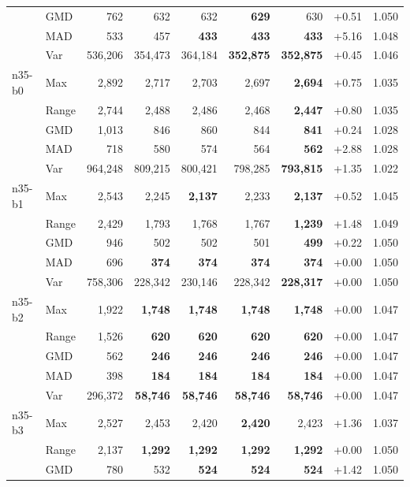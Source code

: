 \begin{small}
\begin{longtable}{llrrrrrrr}
 & GMD & 762 & 632 & 632 & \textbf{629} & 630 & +0.51 & 1.050 \\
 & MAD & 533 & 457 & \textbf{433} & \textbf{433} & \textbf{433} & +5.16 & 1.048 \\
 & Var & 536,206 & 354,473 & 364,184 & \textbf{352,875} & \textbf{352,875} & +0.45 & 1.046 \\
n35-b0 & Max & 2,892 & 2,717 & 2,703 & 2,697 & \textbf{2,694} & +0.75 & 1.035 \\
 & Range & 2,744 & 2,488 & 2,486 & 2,468 & \textbf{2,447} & +0.80 & 1.035 \\
 & GMD & 1,013 & 846 & 860 & 844 & \textbf{841} & +0.24 & 1.028 \\
 & MAD & 718 & 580 & 574 & 564 & \textbf{562} & +2.88 & 1.028 \\
 & Var & 964,248 & 809,215 & 800,421 & 798,285 & \textbf{793,815} & +1.35 & 1.022 \\
n35-b1 & Max & 2,543 & 2,245 & \textbf{2,137} & 2,233 & \textbf{2,137} & +0.52 & 1.045 \\
 & Range & 2,429 & 1,793 & 1,768 & 1,767 & \textbf{1,239} & +1.48 & 1.049 \\
 & GMD & 946 & 502 & 502 & 501 & \textbf{499} & +0.22 & 1.050 \\
 & MAD & 696 & \textbf{374} & \textbf{374} & \textbf{374} & \textbf{374} & +0.00 & 1.050 \\
 & Var & 758,306 & 228,342 & 230,146 & 228,342 & \textbf{228,317} & +0.00 & 1.050 \\
n35-b2 & Max & 1,922 & \textbf{1,748} & \textbf{1,748} & \textbf{1,748} & \textbf{1,748} & +0.00 & 1.047 \\
 & Range & 1,526 & \textbf{620} & \textbf{620} & \textbf{620} & \textbf{620} & +0.00 & 1.047 \\
 & GMD & 562 & \textbf{246} & \textbf{246} & \textbf{246} & \textbf{246} & +0.00 & 1.047 \\
 & MAD & 398 & \textbf{184} & \textbf{184} & \textbf{184} & \textbf{184} & +0.00 & 1.047 \\
 & Var & 296,372 & \textbf{58,746} & \textbf{58,746} & \textbf{58,746} & \textbf{58,746} & +0.00 & 1.047 \\
n35-b3 & Max & 2,527 & 2,453 & 2,420 & \textbf{2,420} & 2,423 & +1.36 & 1.037 \\
 & Range & 2,137 & \textbf{1,292} & \textbf{1,292} & \textbf{1,292} & \textbf{1,292} & +0.00 & 1.050 \\
 & GMD & 780 & 532 & \textbf{524} & \textbf{524} & \textbf{524} & +1.42 & 1.050 \\

\end{longtable}
\end{small}
